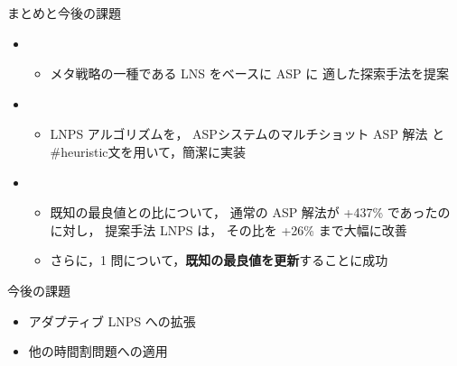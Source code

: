 \documentclass[11pt,dvipdfmx]{beamer}
\begin{document}
\begin{frame}{まとめと今後の課題}
  \begin{itemize}
    \item {}
     \begin{itemize}
      \item メタ戦略の一種である LNS をベースに ASP に
      適した探索手法を提案
     \end{itemize}
    \item {}
      \begin{itemize}
      \item LNPS アルゴリズムを，
        ASPシステム{\clingo}のマルチショット ASP 解法
        と\textsf{\#heuristic}文を用いて，簡潔に実装
      \end{itemize}
    \item {}
      \begin{itemize}
      \item 既知の最良値との比について，
      通常の ASP 解法が +437\% であったのに対し，
      提案手法 LNPS は，
      その比を +26\% まで大幅に改善
      \item さらに，1 問について，\alert{\bf 既知の最良値を更新}することに成功
      \end{itemize}
    \end{itemize}

\begin{alertblock}{今後の課題}
  \begin{itemize}
  \item アダプティブ LNPS への拡張
  \item 他の時間割問題への適用
  \end{itemize}
\end{alertblock}
\end{frame}
\end{document}
